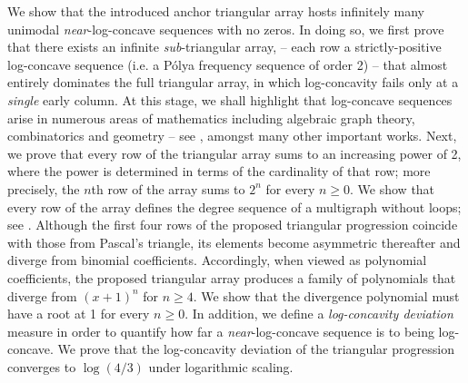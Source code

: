\documentclass[a4paper,12pt]{article}
\begin{document}
We show that the introduced anchor triangular array hosts infinitely many unimodal \emph{near}-log-concave sequences with no zeros. In doing so, we first prove that there exists an infinite \emph{sub}-triangular array, -- each row a strictly-positive log-concave sequence (i.e. a Pólya frequency sequence of order 2) -- that almost entirely dominates the full triangular array, in which log-concavity fails only at a \emph{single} early column. At this stage, we shall highlight that log-concave sequences arise in numerous areas of mathematics including algebraic graph theory, combinatorics and geometry -- see \cite{0aa,1a,2,3,4,5,6,7,8,9,10,11,12}, amongst many other important works. Next, we prove that every row of the triangular array sums to an increasing power of 2, where the power is determined in terms of the cardinality of that row; more precisely, the $n$th row of the array sums to $2^n$ for every $n\geq0$. We show that every row of the array defines the degree sequence of a multigraph without loops; see \cite{graphone}. Although the first four rows of the proposed triangular progression coincide with those from Pascal's triangle, its elements become asymmetric thereafter and diverge from binomial coefficients. Accordingly, when viewed as polynomial coefficients, the proposed triangular array produces a family of polynomials that diverge from $(x+1)^n$ for $n \geq 4$. We show that the divergence polynomial must have a root at 1 for every $n\geq 0$. In addition, we define a \emph{log-concavity deviation} measure in order to quantify how far a \emph{near}-log-concave sequence is to being log-concave. We prove that the log-concavity deviation of the triangular progression converges to $\log(4/3)$ under logarithmic scaling. 
\end{document}
